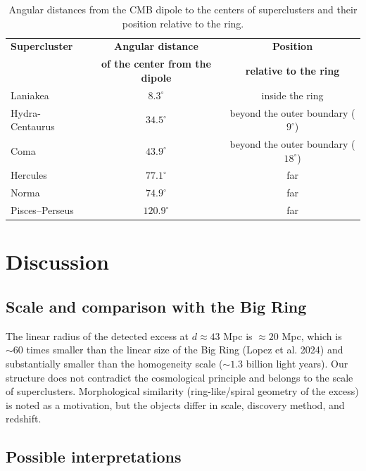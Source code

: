\documentclass[11pt,a4paper]{article}
\begin{document}
\begin{table}[H]
\centering
\begin{tabular}{lcc}
\toprule
\textbf{Supercluster} & \textbf{Angular distance} & \textbf{Position} \\
 & \textbf{of the center from the dipole} & \textbf{relative to the ring} \\
\midrule
Laniakea & \(8.3^\circ\) & inside the ring \\
Hydra-Centaurus & \(34.5^\circ\) & beyond the outer boundary (\(9^\circ\)) \\
Coma & \(43.9^\circ\) & beyond the outer boundary (\(18^\circ\)) \\
Hercules & \(77.1^\circ\) & far \\
Norma & \(74.9^\circ\) & far \\
Pisces--Perseus & \(120.9^\circ\) & far \\
\bottomrule
\end{tabular}
\caption{Angular distances from the CMB dipole to the centers of superclusters
and their position relative to the ring.}
\label{tab:superclusters}
\end{table}

\section{Discussion}

\subsection{Scale and comparison with the Big Ring}

The linear radius of the detected excess at \(d \approx 43\) Mpc is
\(\approx 20\) Mpc, which is \(\sim 60\) times smaller than the linear size
of the Big Ring (Lopez et al. 2024) and substantially smaller than the
homogeneity scale (\(\sim 1.3\) billion light years).
Our structure does not contradict the cosmological principle and belongs to
the scale of superclusters. Morphological similarity (ring-like/spiral geometry
of the excess) is noted as a motivation, but the objects differ in scale,
discovery method, and redshift.

\subsection{Possible interpretations}
\end{document}
